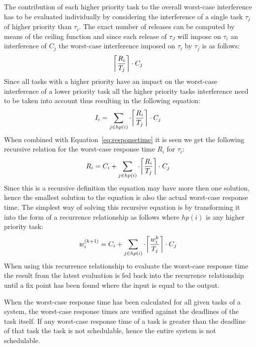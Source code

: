The contribution of each higher priority task to the overall worst-case interference has to be evaluated individually by considering the interference of a single task $\tau_j$ of higher priority than $\tau_i$.
The exact number of releases can be computed by means of the ceiling function and since each release of $\tau_J$ will impose on $\tau_i$ an interference of $C_j$ the worst-case interference imposed on $\tau_i$ by $\tau_j$ is as follows:
\begin{equation}
\ceil*{\frac{R_i}{T_j}} \cdot C_j
\end{equation}
Since all tasks with a higher priority have an impact on the worst-case interference of a lower priority task all the higher priority tasks interference need to be taken into account thus resulting in the following equation:
\begin{equation}
I_i = \sum_{j\in hp(i)} \cdot \ceil*{\frac{R_i}{T_j}} \cdot C_j
\end{equation}
When combined with Equation~\ref{eq:responsetime} it is seen we get the following recursive relation for the worst-case response time $R_i$ for $\tau_i$:
\begin{equation}
R_i = C_i + \sum_{j\in hp(i)} \cdot \ceil*{\frac{R_i}{T_j}} \cdot C_j
\end{equation}
Since this is a recursive definition the equation may have more then one solution, hence the smallest solution to the equation is also the actual worst-case response time. 
The simplest way of solving this recursive equation is by transforming it into the form of a recurrence relationship as follows where $hp(i)$ is any higher priority task:
\begin{equation}
w^{(k+1)}_{i} = C_i + \sum_{j\in hp(i)} \cdot \ceil*{\frac{w^{k}_{i}}{T_j}} \cdot C_j
\end{equation}
When using this recurrence relationship to evaluate the worst-case response time the result from the latest evaluation is fed back into the recurrence relationship until a fix point has been found where the input is equal to the output. 

When the worst-case response time has been calculated for all given tasks of a system, the worst-case response times are verified against the deadlines of the task itself.
If any worst-case response time of a task is greater than the deadline of that task the task is not schedulable, hence the entire system is not schedulable. 